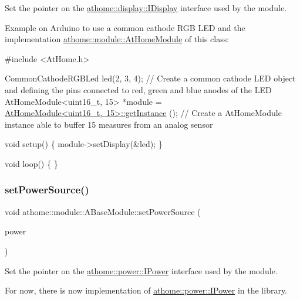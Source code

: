 Set the pointer on the \mbox{\hyperlink{classathome_1_1display_1_1_i_display}{athome\+::display\+::\+I\+Display}} interface used by the module.

Example on Arduino to use a common cathode R\+GB L\+ED and the implementation \mbox{\hyperlink{classathome_1_1module_1_1_at_home_module}{athome\+::module\+::\+At\+Home\+Module}} of this class\+:


\begin{DoxyCode}
\textcolor{preprocessor}{#include <AtHome.h>}

CommonCathodeRGBLed led(2, 3, 4); \textcolor{comment}{// Create a common cathode LED object and defining the pins connected to
       red, green and blue anodes of the LED}
AtHomeModule<uint16\_t, 15> *module = \mbox{\hyperlink{classathome_1_1module_1_1_at_home_module_acc6e7fc0d86f11648fd81729484e546f}{AtHomeModule<uint16\_t, 15>::getInstance}}
      (); \textcolor{comment}{// Create a AtHomeModule instance able to buffer 15 measures from an analog sensor}

\textcolor{keywordtype}{void} setup() \{
  module->setDisplay(&led);
\}

\textcolor{keywordtype}{void} loop() \{
\}
\end{DoxyCode}
 \mbox{\label{classathome_1_1module_1_1_a_base_module_a0c217f9a8d052efc5490bc9145fdf7f9}} 
\subsubsection{\texorpdfstring{set\+Power\+Source()}{setPowerSource()}}
{\footnotesize\ttfamily void athome\+::module\+::\+A\+Base\+Module\+::set\+Power\+Source (\begin{DoxyParamCaption}\item[{\mbox{\hyperlink{classathome_1_1power_1_1_i_power}{power\+::\+I\+Power}} $\ast$}]{power }\end{DoxyParamCaption})}

Set the pointer on the \mbox{\hyperlink{classathome_1_1power_1_1_i_power}{athome\+::power\+::\+I\+Power}} interface used by the module.

For now, there is now implementation of \mbox{\hyperlink{classathome_1_1power_1_1_i_power}{athome\+::power\+::\+I\+Power}} in the library. \mbox{\label{classathome_1_1module_1_1_a_base_module_a071b5d07dc3497908520a5b0dc9404ef}} 

